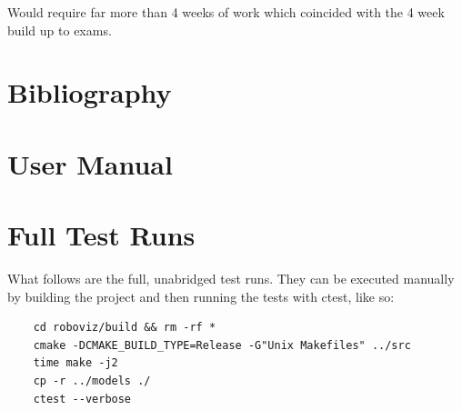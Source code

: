 \documentclass[11pt,a4paper]{article}
\begin{document}
Would require far more than 4 weeks of work which coincided with the 4 week
build up to exams.

\section{Bibliography}
\printbibliography

\appendix
\section{User Manual}
\label{s:user-manual}


\section{Full Test Runs}
What follows are the full, unabridged test runs. They can be executed manually
by building the project and then running the tests with ctest, like so:

\begin{verbatim}
    cd roboviz/build && rm -rf *
    cmake -DCMAKE_BUILD_TYPE=Release -G"Unix Makefiles" ../src
    time make -j2
    cp -r ../models ./
    ctest --verbose
\end{verbatim}


\label{s:full-test-runs}

\end{document}
